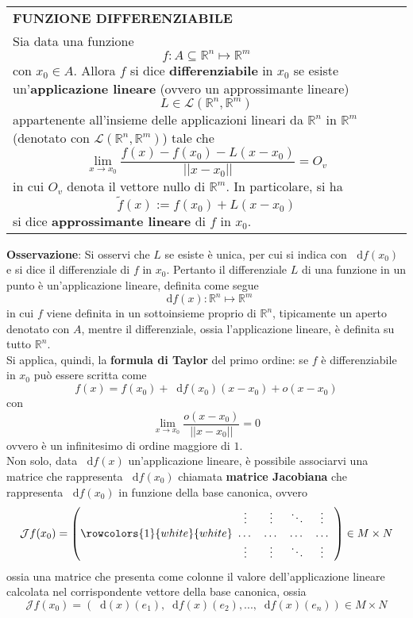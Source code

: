 \documentclass[a4paper]{extarticle}
\renewcommand\arraystretch{}
\newcommand*\dif{\mathop{}\!\mathrm{d}}
\begin{document}
\vspace{1em}
\setlength{\tabcolsep}{14pt}
\renewcommand{\arraystretch}{2}
\noindent
\begin{tabularx}{\textwidth}{@{}|P|@{}}
    \hline
    {\textbf{FUNZIONE DIFFERENZIABILE}}\\
    \parbox{\linewidth}{Sia data una funzione
    \[f : A \subseteq \mathbb{R}^n \longmapsto \mathbb{R}^m\]
    con $x_0 \in A$. Allora $f$ si dice \textbf{differenziabile} in $x_0$ se esiste un'\textbf{applicazione lineare} (ovvero un approssimante lineare)
    \[L \in \mathcal{L}(\mathbb{R}^n, \mathbb{R}^m)\]
    appartenente all'insieme delle applicazioni lineari da $\mathbb{R}^n$ in $\mathbb{R}^m$ (denotato con $\mathcal{L}(\mathbb{R}^n, \mathbb{R}^m)$) tale che
    \[\boxed{\lim_{x \to x_0} \dfrac{f(x) - f(x_0) - L(x-x_0)}{\left\vert\left\vert x-x_0\right\vert\right\vert}=O_v}\]
    in cui $O_v$ denota il vettore nullo di $\mathbb{R}^m$. In particolare, si ha
    \[\widetilde{f}(x) := f(x_0) + L(x-x_0)\]
    si dice \textbf{approssimante lineare} di $f$ in $x_0$.
    \vspace{3mm}}\\
    \hline
\end{tabularx}

\vspace{2em}
\noindent
\textbf{Osservazione}: Si osservi che $L$ se esiste è unica, per cui si indica con $\dif f(x_0)$ e si dice il differenziale di $f$ in $x_0$. Pertanto il differenziale $L$ di una funzione in un punto è un'applicazione lineare, definita come segue
\[\boxed{\dif f(x) : \mathbb{R}^n \longmapsto \mathbb{R}^m}\]
in cui $f$ viene definita in un sottoinsieme proprio di $\mathbb{R}^n$, tipicamente un aperto denotato con $A$, mentre il differenziale, ossia l'applicazione lineare, è definita su tutto $\mathbb{R}^n$.\\
Si applica, quindi, la \textbf{formula di Taylor} del primo ordine: se $f$ è differenziabile in $x_0$ può essere scritta come
\[f(x) = f(x_0) + \dif f(x_0)(x-x_0) + o(x-x_0)\]
con
\[\lim_{x \to x_0} \frac{o(x-x_0)}{\left\vert\left\vert x-x_0 \right\vert\right\vert}=0\]
ovvero è un infinitesimo di ordine maggiore di $1$.\\
Non solo, data $\dif f(x)$ un'applicazione lineare, è possibile associarvi una matrice che rappresenta $\dif f(x_0)$ chiamata \textbf{matrice Jacobiana} che rappresenta $\dif f(x_0)$ in funzione della base canonica, ovvero
\[\mathcal{J} f(x_0) =
    \left(
        \rowcolors{1}{white}{white}
        \begin{array}{cccc}
            \vdots & \vdots & \ddots & \vdots\\
            \dots  & \dots  & \dots  & \dots\\
            \vdots & \vdots & \ddots & \vdots\\
        \end{array}
    \right) \in M \times N
\]
ossia una matrice che presenta come colonne il valore dell'applicazione lineare calcolata nel corrispondente vettore della base canonica, ossia
\[\mathcal{J} f(x_0) =\left(\dif(x)(e_1),\dif f(x) (e_2), ..., \dif f(x) (e_n)\right) \in M \times N\]
\end{document}
